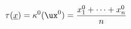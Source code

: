 \begin{equation}
\label{atau}
\tau(\underline x)=\kappa^0(\ux^0)=\frac{x_1^0+\dotsb+x_n^0}{n}
\end{equation}

